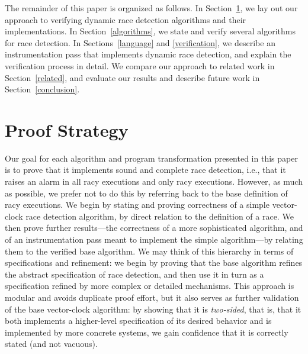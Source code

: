 \documentclass[preprint, 9pt]{sigplanconf}
\begin{document}
The remainder of this paper is organized as follows. In Section~\ref{strategy}, we lay out our approach to verifying dynamic race detection algorithms and their implementations. In Section~\ref{algorithms}, we state and verify several algorithms for race detection. In Sections~\ref{language} and \ref{verification}, we describe an instrumentation pass that implements dynamic race detection, and explain the verification process in detail. We compare our approach to related work in Section~\ref{related}, and evaluate our results and describe future work in Section~\ref{conclusion}.

\section{Proof Strategy}
\label{strategy}
Our goal for each algorithm and program transformation presented in this paper is to prove that it implements sound and complete race detection, i.e., that it raises an alarm in all racy executions and only racy executions. However, as much as possible, we prefer not to do this by referring back to the base definition of racy executions. We begin by stating and proving correctness of a simple vector-clock race detection algorithm, by direct relation to the definition of a race. We then prove further results---the correctness of a more sophisticated algorithm, and of an instrumentation pass meant to implement the simple algorithm---by relating them to the verified base algorithm. We may think of this hierarchy in terms of specifications and refinement: we begin by proving that the base algorithm refines the abstract specification of race detection, and then use it in turn as a specification refined by more complex or detailed mechanisms. This approach is modular and avoids duplicate proof effort, but it also serves as further validation of the base vector-clock algorithm: by showing that it is \emph{two-sided}, that is, that it both implements a higher-level specification of its desired behavior and is implemented by more concrete systems, we gain confidence that it is correctly stated (and not vacuous).
\end{document}
